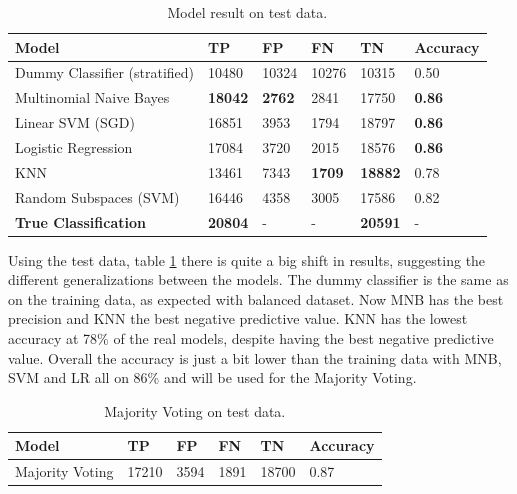 \begin{table}[H]
    \centering
    \caption{Model result on test data.}
    \label{tab:test-table}
    \begin{tabular}{@{}llllll@{}}
    \toprule
    Model                         & TP             & FP            & FN            & TN             & Accuracy      \\ \midrule
    Dummy Classifier (stratified) & 10480          & 10324         & 10276         & 10315          & 0.50          \\
    Multinomial Naive Bayes       & \textbf{18042} & \textbf{2762} & 2841          & 17750          & \textbf{0.86} \\
    Linear SVM (SGD)              & 16851          & 3953          & 1794          & 18797          & \textbf{0.86} \\
    Logistic Regression           & 17084          & 3720          & 2015          & 18576          & \textbf{0.86} \\
    KNN                           & 13461          & 7343          & \textbf{1709} & \textbf{18882} & 0.78          \\
    Random Subspaces (SVM)        & 16446          & 4358          & 3005          & 17586          & 0.82          \\ \midrule
    \textbf{True Classification}  & \textbf{20804} & -    & -    & \textbf{20591} & -    
    \end{tabular}
\end{table}


Using the test data, table \ref{tab:test-table} there is quite a big shift in results, suggesting the different generalizations between the models. 
The dummy classifier is the same as on the training data, as expected with balanced dataset. 
Now MNB has the best precision and KNN the best negative predictive value. 
KNN has the lowest accuracy at 78\% of the real models, despite having the best negative predictive value. 
Overall the accuracy is just a bit lower than the training data with MNB, SVM and LR all on 86\% and will be used for the Majority Voting. 


\begin{table}[H]
    \centering
    \caption{Majority Voting on test data.}
    \label{tab:voting-table}
    \begin{tabular}{@{}llllll@{}}
    \toprule
    Model                  & TP    & FP   & FN   & TN    & Accuracy \\ \midrule
    Majority Voting     & 17210 & 3594 & 1891 & 18700 & 0.87     \\ \bottomrule
    \end{tabular}
\end{table}


